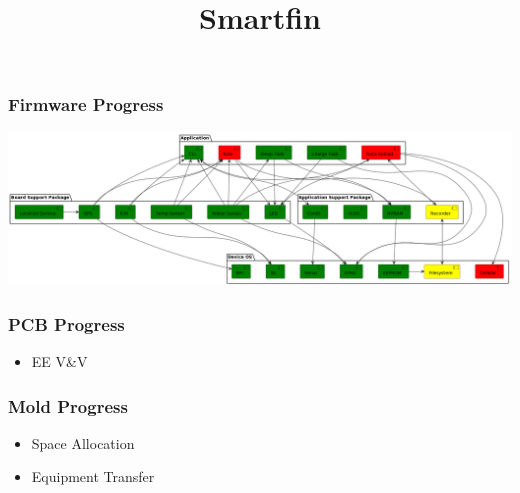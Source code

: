 \documentclass[handout]{beamer}
\title{Smartfin}
\begin{document}
\maketitle
\begin{frame}
    \frametitle{Firmware Progress}
    \includegraphics[width=\textwidth]{2023-10-17 Service Diagram.png}
\end{frame}
\begin{frame}
    \frametitle{PCB Progress}
    \begin{itemize}
        \item EE V\&V
    \end{itemize}
\end{frame}
\begin{frame}
    \frametitle{Mold Progress}
    \begin{itemize}
        \item Space Allocation
        \item Equipment Transfer
    \end{itemize}
\end{frame}
\end{document}
